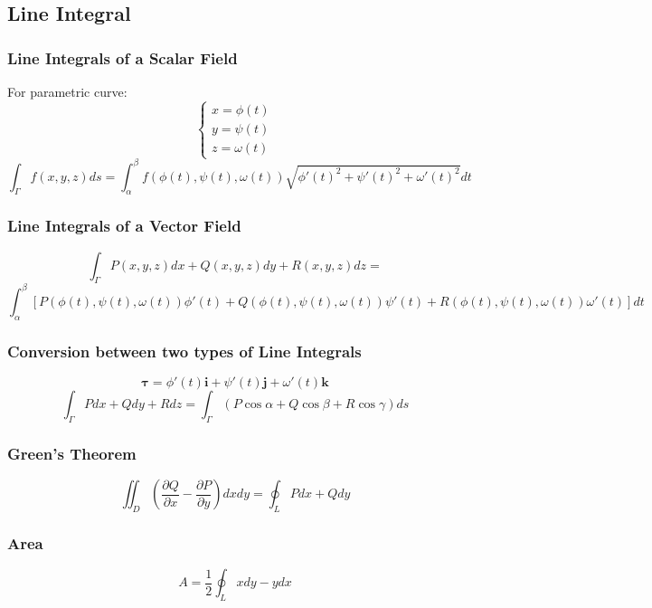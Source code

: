 \documentclass{article}
\begin{document}
\subsection{Line Integral}

\subsubsection{Line Integrals of a Scalar Field}

For parametric curve:
\[
    \begin{cases}
        x = \phi(t) \\
        y = \psi(t) \\
        z = \omega(t)
    \end{cases}
\]
\[
    \int_\Gamma f(x, y, z) ds = \int_\alpha^\beta f(\phi(t), \psi(t), \omega(t)) \sqrt{\phi'(t)^2 + \psi'(t)^2 + \omega'(t)^2} dt
\]

\subsubsection{Line Integrals of a Vector Field}

\[
    \int_\Gamma P(x, y, z) dx + Q(x, y, z) dy + R(x, y, z) dz =
\]
\[
    \int_\alpha^\beta \left[P(\phi(t), \psi(t), \omega(t)) \phi'(t) + Q(\phi(t), \psi(t), \omega(t)) \psi'(t) + R(\phi(t), \psi(t), \omega(t)) \omega'(t)\right] dt
\]

\subsubsection{Conversion between two types of Line Integrals}

\[
    \boldsymbol{\tau} = \phi'(t) \mathbf{i} + \psi'(t) \mathbf{j} + \omega'(t) \mathbf{k}
\]
\[
    \int_\Gamma P dx + Q dy + R dz = \int_\Gamma (P \cos \alpha + Q \cos \beta + R \cos \gamma) ds
\]

\subsubsection{Green's Theorem}

\[
    \iint_D \left(\frac{\partial Q}{\partial x} - \frac{\partial P}{\partial y}\right) dx dy = \oint_L P dx + Q dy
\]

\subsubsection{Area}

\[
    A = \frac{1}{2} \oint_L x dy - y dx
\]
\end{document}
